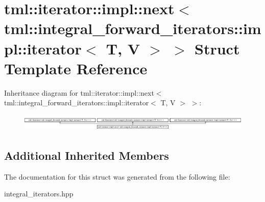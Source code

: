 \hypertarget{structtml_1_1iterator_1_1impl_1_1next_3_01tml_1_1integral__forward__iterators_1_1impl_1_1iterator_3_01T_00_01V_01_4_01_4}{\section{tml\+:\+:iterator\+:\+:impl\+:\+:next$<$ tml\+:\+:integral\+\_\+forward\+\_\+iterators\+:\+:impl\+:\+:iterator$<$ T, V $>$ $>$ Struct Template Reference}
\label{structtml_1_1iterator_1_1impl_1_1next_3_01tml_1_1integral__forward__iterators_1_1impl_1_1iterator_3_01T_00_01V_01_4_01_4}
}
Inheritance diagram for tml\+:\+:iterator\+:\+:impl\+:\+:next$<$ tml\+:\+:integral\+\_\+forward\+\_\+iterators\+:\+:impl\+:\+:iterator$<$ T, V $>$ $>$\+:\begin{figure}[H]
\begin{center}
\leavevmode
\includegraphics[height=0.825959cm]{structtml_1_1iterator_1_1impl_1_1next_3_01tml_1_1integral__forward__iterators_1_1impl_1_1iterator_3_01T_00_01V_01_4_01_4}
\end{center}
\end{figure}
\subsection*{Additional Inherited Members}


The documentation for this struct was generated from the following file\+:\begin{DoxyCompactItemize}
\item 
integral\+\_\+iterators.\+hpp\end{DoxyCompactItemize}
